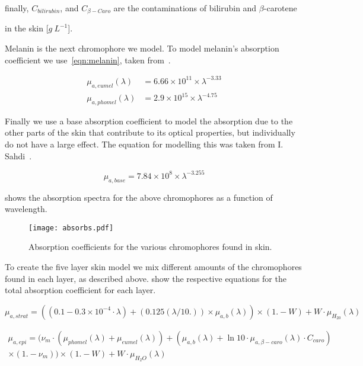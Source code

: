 \indent finally, $C_{bilirubin}$, and $C_{\beta-Caro}$ are the contaminations of bilirubin and $\beta$-carotene 

\indent in the skin [$g\ L^{-1}$].

\medskip

Melanin is the next chromophore we model.
To model melanin's absorption coefficient we use~\cref{eqn:melanin}, taken from~\cite{iglesias2015biophysically}.

\begin{align}
\mu_{a,eumel}(\lambda)&=6.66\times10^{11} \times \lambda^{-3.33}\\
\mu_{a,phomel}(\lambda)&=2.9\times10^{15} \times \lambda^{-4.75}
\label{eqn:melanin}
\end{align}

Finally we use a base absorption coefficient to model the absorption due to the other parts of the skin that contribute to its optical properties, but individually do not have a large effect.
The equation for modelling this was taken from I. Sahdi~\cite{saidi1992transcutaneous}.

\begin{equation}
\mu_{a,base}=7.84\times10^{8}\times\lambda^{-3.255}
\label{eqn:base}
\end{equation}


 shows the absorption spectra for the above chromophores as a function of wavelength.

\begin{figure}[!htpb]
	\centering
	\texttt{[image: absorbs.pdf]}
	\caption{Absorption coefficients for the various chromophores found in skin.}
	\label{fig:absorcoeff}
\end{figure}

To create the five layer skin model we mix different amounts of the chromophores found in each layer, as described above.
 show the respective equations for the total absorption coefficient for each layer.

\begin{equation}
\mu_{a,strat}= ((0.1 - 0.3\times10^{-4}\cdot\lambda) + (0.125(\lambda/10.))\times \mu_{a,b}(\lambda))\times(1. - W) + W\cdot\mu_{H_20}(\lambda)
\label{eqn:stratabs}
\end{equation}

\begin{equation}
\begin{split}
\mu_{a,epi}= (\nu_m \cdot (\mu_{phomel}(\lambda) + \mu_{eumel}(\lambda)) + (\mu_{a,b}(\lambda) + \ln10 \cdot \mu_{a,\beta-caro}(\lambda) \cdot C_{caro}) \\ \times (1. - \nu_m)) \times(1. - W) + W \cdot \mu_{H_2O}(\lambda)
\end{split}
\label{eqn:epiabs}
\end{equation}

